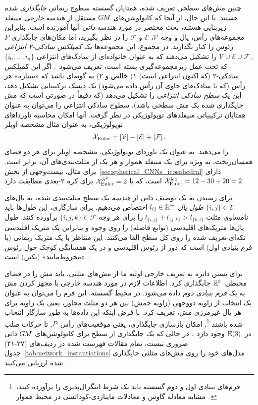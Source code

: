 چنین مش‌های سطحی تعریف شده، همتایان گسسته سطوح ریمانی \emph{جایگذاری شده} هستند.
با این حال، از آنجا که کانولوشن‌های $G\mkern-1.4muM$ مستقل از هندسه \emph{خارجی} منیفلد زیربنایی هستند، بحث مختصر در مورد هندسه \emph{ذاتی} آنها آموزنده است.
بنابراین مجموعه‌های رأس، یال و وجه $\mathcal{V}$، $\mathcal{E}$ و $\mathcal{F}$ را در نظر بگیرید، اما مکان‌های جایگذاری $P$ رئوس را کنار بگذارید.
در مجموع، این مجموعه‌ها یک \emph{کمپلکس سادکی-۲ انتزاعی}
$\mathcal{V} \cup \mathcal{E} \cup \mathcal{F} \,,$
را تشکیل می‌دهند که به عنوان خانواده‌ای از سادک‌های انتزاعی $\{i_0,\dots,i_n\}$ که تحت عمل زیرمجموعه‌گیری بسته است، تعریف می‌شود~\cite{craneDiscreteDifferentialGeometry2014}.
اگر این کمپلکس سادکی-۲ (که اکنون انتزاعی است)
۱) خالص و
۲) به گونه‌ای باشد که «ستاره» هر رأس (که با سادک‌های حاوی آن رأس داده می‌شود) یک دیسک ترکیبیاتی تشکیل دهد،
این یک \emph{سطح سادکی انتزاعی} را تشکیل می‌دهد (که دقیقاً در صورتی است که مش جایگذاری شده یک مش سطحی باشد).
سطوح سادکی انتزاعی را می‌توان به عنوان همتایان ترکیبیاتی منیفلدهای توپولوژیکی در نظر گرفت.
آنها امکان محاسبه ناورداهای توپولوژیکی، به عنوان مثال مشخصه اویلر
\begin{align}
    \mathcal{X}_{\textup{Euler}} = |\mathcal{V}|-|\mathcal{E}|+|\mathcal{F}| \,.
\end{align}
را می‌دهند. به عنوان یک ناوردای توپولوژیکی، مشخصه اویلر برای هر دو فضای همسان‌ریخت، به ویژه برای یک منیفلد هموار و هر یک از مثلث‌بندی‌های آن، برابر است.
برای مثال، بیست‌وجهی از بخش~\ref{sec:spherical_CNNs_icosahedral} دارای $\mathcal{X}_{\textup{Euler}}^\textup{ico} = 12-30+20 = 2$ است، که با $\mathcal{X}_{\textup{Euler}}^{S^2} = 2$ برای کره ۲-بعدی مطابقت دارد.


برای رسیدن به یک توصیف ذاتی از \emph{هندسه} یک سطح مثلث‌بندی شده، به یال‌های $\{i,j\} \in \mathcal{E}$ \emph{طول یال} ${l_{ij} \in \mathbb{R}^+}$ اختصاص می‌دهیم.
برای سازگاری، این طول‌ها باید نامساوی مثلث $l_{\{i,j\}} + l_{\{j,k\}} > l_{\{k,i\}}$ را برای هر وجه $\{i,j,k\} \in \mathcal{F}$ برآورده کنند.
طول یال‌ها متریک‌های اقلیدسی (توابع فاصله) را روی وجوه و بنابراین یک متریک اقلیدسی تکه‌ای-تعریف شده را روی کل سطح القا می‌کنند.
این متناظر با یک متریک ریمانی (یا فرم بنیادی اول) است که دور از رئوس اقلیدسی و در یک همسایگی کوچک حول رئوس «مخروط‌مانند» (تکین) است~\cite{Crane2020DiscreteConformalGeometry,desbrun2005DiscreteExteriorCalculus}.


برای بستن دایره به تعریف خارجی اولیه ما از مش‌های مثلثی، باید مش را در فضای محیطی~$\mathbb{R}^3$ جایگذاری کرد.
اطلاعات لازم در مورد هندسه خارجی با مجهز کردن مش به یک \emph{فرم بنیادی دوم} داده می‌شود.
در محیط گسسته، این فرم را می‌توان به عنوان یک انتخاب از زاویه دووجهی (زاویه خمش) بین هر دو مثلث مجاور، یعنی یک زاویه برای هر یال غیرمرزی مش، تعریف کرد.
با فرض اینکه این داده‌ها به طور سازگار انتخاب شده باشند%
\footnote{
    فرم‌های بنیادی اول و دوم گسسته باید یک شرط انتگرال‌پذیری را برآورده کنند،
    مشابه معادله گاوس و معادلات مایناردی-کوداتسی در محیط هموار~\cite{wang2012surfaceReconstruction}.
},
امکان بازسازی جایگذاری، یعنی موقعیت‌های رأس~$P$, تا حرکات صلب در~$\operatorname{E}(3)$ وجود دارد~\cite{lipman2005linear,wang2012surfaceReconstruction}.
در حالی که یک جایگذاری از سطح برای کانولوشن‌های $G\mkern-1.4muM$ ذاتی ضروری نیست، تمام مقالات فهرست شده در ردیف‌های (۳۷-۴۱) جدول~\ref{tab:network_instantiations} مدل‌های خود را روی مش‌های مثلثی جایگذاری شده ارزیابی می‌کنند.



